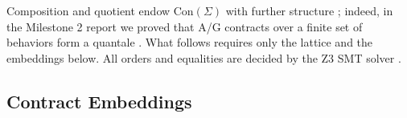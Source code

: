 \documentclass[10pt]{article}
\newif\ifshowcomments
\newcommand{\Con}[1]{\text{Con}(#1)}
\theoremstyle{definition}
\theoremstyle{remark}
\newcommand{\ai}[1]{%
    \ifshowcomments
        \noindent\textcolor{techred}{[AI Agent]: #1}%
    \fi
}
\begin{document}
Composition and quotient endow $\Con{\Sigma}$ with further structure \citep{incerPactiAssumeGuaranteeContracts2025}; indeed, in the Milestone 2 report we proved that A/G contracts over a finite set of behaviors form a quantale \citep{riessSEAMANMS2}. What follows requires only the lattice and the embeddings below. All orders and equalities are decided by the Z3 SMT solver \citep{deMouraZ32008}.
\ai{I added bibliography entries for the Milestone 1--3 reports (cited here, in \Cref{sec:intro}, and in \Cref{sec:sheaves}). I could only verify the MS2/MS3 titles from the PDFs in \texttt{doc/\_old}; please confirm the MS1 title and the years I guessed (MS1: 2025, MS2/MS3: 2026) in \texttt{report.bib}.}

\subsection{Contract Embeddings}
\label{sec:embeddings}
\end{document}
